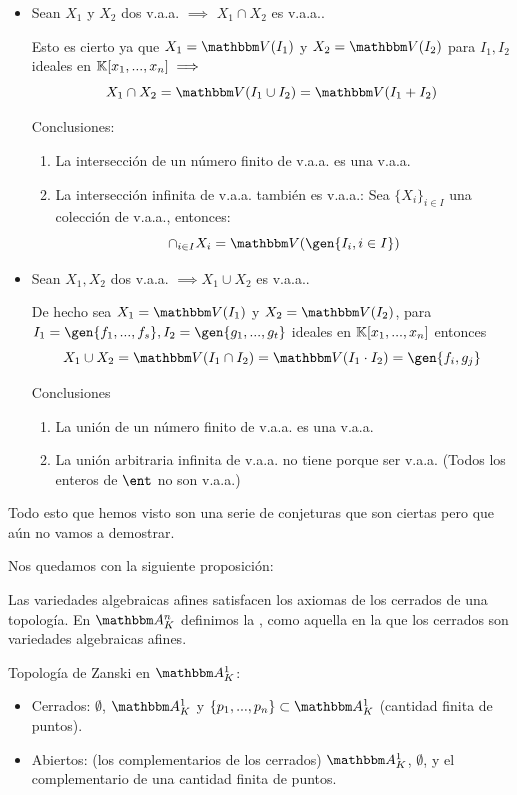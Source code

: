 \begin{itemize}
	\item Sean $X_1$ y $X_2$ dos v.a.a. $\implies$ $X_1 \cap X_2$ es v.a.a..

	Esto es cierto ya que $X_1=\V(I_1)$ y $X_2=\V(I_2)$ para $I_1,I_2$ ideales en $\mathbb{K}[x_1,...,x_n] \implies$
	$$X_1 \cap X_2 = \V(I_1 \cup I_2)=\V(I_1+I_2)$$


	Conclusiones:
	\begin{enumerate}
		\item La intersección de un número finito de v.a.a. es una v.a.a.
		\item La intersección infinita de v.a.a. también es v.a.a.: Sea $\{ X_i \}_{i\in I}$ una colección de v.a.a., entonces:
		\[ \cap_{i\in I}X_i = \V(\gen{I_i, i \in I}) \]
	\end{enumerate}
	\item Sean $X_1, X_2$ dos v.a.a. $\implies X_1 \cup X_2$ es v.a.a..

	De hecho sea  $X_1=\V(I_1)$ y $X_2=\V(I_2)$,  para $I_1=\gen{f_1,...,f_s},I_2=\gen{g_1,...,g_t}$ ideales en $\mathbb{K}[x_1,...,x_n]$ entonces
	$$X_1 \cup X_2=\V(I_1 \cap I_2)=\V(I_1 \cdot I_2)=\gen{f_i, g_j}$$

	Conclusiones
	\begin{enumerate}
		\item La unión de un número finito de v.a.a. es una v.a.a.
		\item La unión arbitraria infinita de v.a.a. no tiene porque ser v.a.a. (Todos los enteros de $\ent$ no son v.a.a.)
	\end{enumerate}
\end{itemize}

Todo esto que hemos visto son una serie de conjeturas que son ciertas pero que aún no vamos a demostrar.

Nos quedamos con la siguiente proposición:

\begin{prop}
	Las variedades algebraicas afines satisfacen los axiomas de los cerrados de una topología. En $\Akn$ definimos la , como aquella en la que los cerrados son variedades algebraicas afines.
\end{prop}

\begin{example}
	Topología de Zanski en $\A^1_K$:
	\begin{itemize}
		\item Cerrados: $\emptyset$, $\A^1_K$ y $\{ p_1,...,p_n \} \subset \A^1_K$ (cantidad finita de puntos).
		\item Abiertos: (los complementarios de los cerrados) $\A^1_K$, $\emptyset$, y el complementario de una cantidad finita de puntos.
	\end{itemize}
\end{example}



